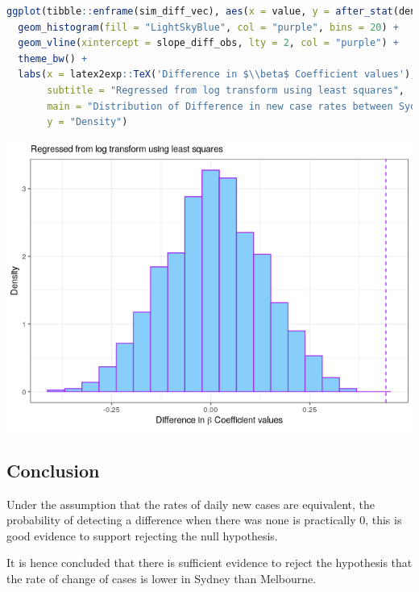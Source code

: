 \documentclass{article}
\begin{document}
\begin{lstlisting}[language=R]
ggplot(tibble::enframe(sim_diff_vec), aes(x = value, y = after_stat(density))) +
  geom_histogram(fill = "LightSkyBlue", col = "purple", bins = 20) +
  geom_vline(xintercept = slope_diff_obs, lty = 2, col = "purple") +
  theme_bw() +
  labs(x = latex2exp::TeX('Difference in $\\beta$ Coefficient values'),
       subtitle = "Regressed from log transform using least squares", 
       main = "Distribution of Difference in new case rates between Sydney and Melbourne", 
       y = "Density")
\end{lstlisting}

\includegraphics{main_files/figure-html/unnamed-chunk-23-1.png}

\hypertarget{conclusion-3}{%
\subsection{Conclusion}\label{conclusion-3}}

Under the assumption that the rates of daily new cases are equivalent,
the probability of detecting a difference when there was none is
practically 0, this is good evidence to support rejecting the null
hypothesis.

It is hence concluded that there is sufficient evidence to reject the
hypothesis that the rate of change of cases is lower in Sydney than
Melbourne.
\end{document}
